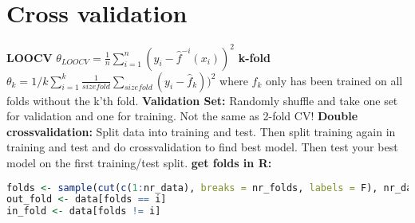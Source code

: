 \section{Cross validation}
\textbf{LOOCV} $\theta_{LOOCV} = \frac{1}{n}\sum_{i=1}^n(y_i - \hat f^{-i}(x_i))^2$
\textbf{k-fold} $\theta_k = 1/k\sum_{i=1}^k \frac{1}{size fold}\sum_{size fold}(y_i-\hat f_k))^2$ where $f_k$ only has been trained on all folds without the k'th fold. 
\textbf{Validation Set:} Randomly shuffle and take one set for validation and one for training. Not the same as 2-fold CV!
\textbf{Double crossvalidation: }Split data into training and test. Then split training again in training and test and do crossvalidation to find best model. Then test your best model on the first training/test split. 
\textbf{get folds in R: } \begin{lstlisting}[language=R]
folds <- sample(cut(c(1:nr_data), breaks = nr_folds, labels = F), nr_data, replace = F) 
out_fold <- data[folds == i]
in_fold <- data[folds != i]
\end{lstlisting}